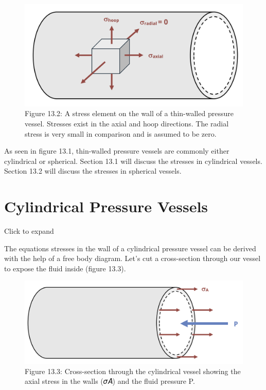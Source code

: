 \documentclass[
  letterpaper,
  DIV=11,
  numbers=noendperiod]{scrreprt}
\begin{document}
\begin{figure}[H]

{\centering \includegraphics[width=5.26042in,height=\textheight]{images/CH13 PNGs/figure 13.2.png}

}

\caption{Figure 13.2: A stress element on the wall of a thin-walled
pressure vessel. Stresses exist in the axial and hoop directions. The
radial stress is very small in comparison and is assumed to be zero.}

\end{figure}%

As seen in figure 13.1, thin-walled pressure vessels are commonly either
cylindrical or spherical. Section 13.1 will discuss the stresses in
cylindrical vessels. Section 13.2 will discuss the stresses in spherical
vessels.

\section{Cylindrical Pressure
Vessels}\label{cylindrical-pressure-vessels}

Click to expand

The equations stresses in the wall of a cylindrical pressure vessel can
be derived with the help of a free body diagram. Let's cut a
cross-section through our vessel to expose the fluid inside (figure
13.3).

\begin{figure}[H]

{\centering \includegraphics[width=6.22917in,height=\textheight]{images/CH13 PNGs/figure 13.3.png}

}

\caption{Figure 13.3: Cross-section through the cylindrical vessel
showing the axial stress in the walls (𝜎𝐴) and the fluid pressure P.}

\end{figure}%
\end{document}
